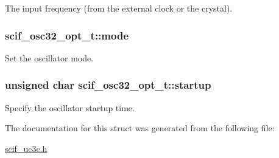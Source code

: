 \-The input frequency (from the external clock or the crystal). 

\hypertarget{structscif__osc32__opt__t_a9c5abc962b1b136103403be646983e21}{
\subsubsection[{mode}]{ {\bf scif\-\_\-osc32\-\_\-opt\-\_\-t\-::mode}}}
\label{structscif__osc32__opt__t_a9c5abc962b1b136103403be646983e21}


\-Set the oscillator mode. 

\hypertarget{structscif__osc32__opt__t_af5305417f3897eb2e3b178485e99238f}{
\subsubsection[{startup}]{\setlength{\rightskip}{0pt plus 5cm}unsigned char {\bf scif\-\_\-osc32\-\_\-opt\-\_\-t\-::startup}}}
\label{structscif__osc32__opt__t_af5305417f3897eb2e3b178485e99238f}


\-Specify the oscillator startup time. 



\-The documentation for this struct was generated from the following file\-:\begin{DoxyCompactItemize}
\item 
\hyperlink{scif__uc3c_8h}{scif\-\_\-uc3c.\-h}\end{DoxyCompactItemize}
